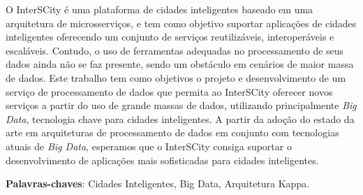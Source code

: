\begin{resumo}

    O InterSCity é uma plataforma de cidades inteligentes baseado em uma
    arquitetura de microsserviços, e tem como objetivo suportar aplicações de %
    cidades inteligentes oferecendo um conjunto de serviços reutilizáveis,
    interoperáveis e escaláveis. Contudo, o uso de ferramentas adequadas no
    processamento de seus dados ainda não se faz presente, sendo um obstáculo
    em cenários de maior massa de dados. Este trabalho tem como objetivos o
    projeto e desenvolvimento de um serviço de processamento de dados que
    permita ao InterSCity oferecer novos serviços a partir do uso de grande
    massas de dados, utilizando principalmente \textit{Big Data}, tecnologia chave para
    cidades inteligentes. A partir da adoção do estado da arte em arquiteturas
    de processamento de dados em conjunto com tecnologias atuais de \textit{Big Data},
    esperamos que o InterSCity consiga suportar o desenvolvimento de aplicações
    mais sofisticadas para cidades inteligentes.

 \vspace{\onelineskip}
 \noindent
 \textbf{Palavras-chaves}: Cidades Inteligentes, Big Data, Arquitetura Kappa.
\end{resumo}
